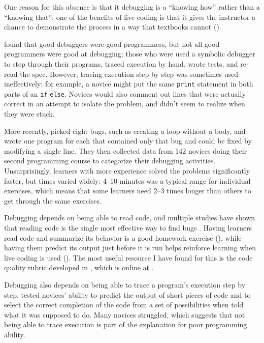 One reason for this absence is that it debugging is a ``knowing how''
rather than a ``knowing that''; one of the benefits of live coding is
that it gives the instructor a chance to demonstrate the process in a
way that textbooks cannot ().

\cite{Fitz2008,Murp2008} found that good debuggers were good
programmers, but not all good programmers were good at debugging;
those who were used a symbolic debugger to step through their
programs, traced execution by hand, wrote tests, and re-read the
spec. However, tracing execution step by step was sometimes used
ineffectively: for example, a novice might put the same \texttt{print}
statement in both parts of an \texttt{if}-\texttt{else}.  Novices
would also comment out lines that were actually correct in an attempt
to isolate the problem, and didn't seem to realize when they were
stuck.

More recently, \cite{Alqa2017} picked eight bugs, such as creating a
loop without a body, and wrote one program for each that contained
only that bug and could be fixed by modifying a single line.  They
then collected data from 142 novices doing their second programming
course to categorize their debugging activities.  Unsurprisingly,
learners with more experience solved the problems significantly
faster, but times varied widely: 4--10 minutes was a typical range for
individual exercises, which means that some learners need 2--3 times
longer than others to get through the same exercises.

Debugging depends on being able to read code, and multiple studies
have shown that reading code is the single most effective way to find
bugs \cite{Basi1987,Keme2009,Bacc2013}.  Having learners read code and
summarize its behavior is a good homework exercise
(), while having them predict its
output just before it is run helps reinforce learning when live coding
is used ().  The most useful resource I
have found for this is the code quality rubric developed in
\cite{Steg2014,Steg2016a}, which is online at \cite{Steg2016b}.

Debugging also depends on being able to trace a program's execution
step by step.  \cite{List2004} tested novices' ability to predict the
output of short pieces of code and to select the correct completion of
the code from a set of possibilities when told what it was supposed to
do.  Many novices struggled, which suggests that not being able to
trace execution is part of the explanation for poor programming
ability.

